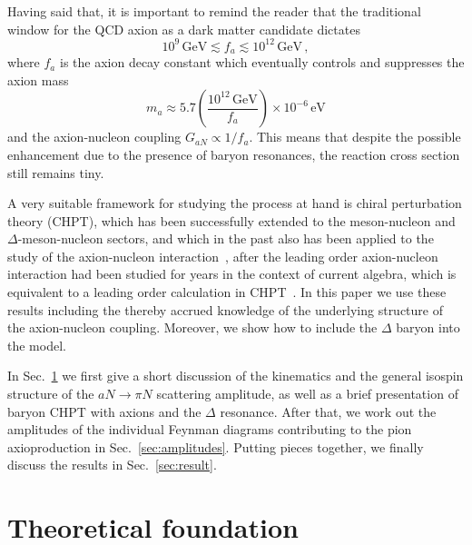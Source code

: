 \documentclass[reprint,amssymb,amsmath,floatfix,aps,prd,groupedaddress,nofootinbib]{revtex4-2}
\begin{document}
Having said that, it is important to remind the reader that the traditional window for the QCD axion as a
dark matter candidate dictates~\cite{Preskill:1982cy,Abbott:1982af,Kim:1986ax,Kim:2008hd}
\begin{equation}\label{eq:window}
10^{9}\,\text{GeV} \lesssim f_a \lesssim 10^{12}\,\text{GeV}\,,
\end{equation}
where $f_a$ is the axion decay constant which eventually controls and suppresses the axion
mass~\cite{Lu:2020rhp,DiLuzio:2020wdo}
\begin{equation}
m_a \approx 5.7 \left(\frac{10^{12}\,\text{GeV}}{f_a} \right) \times 10^{-6}  \,\text{eV}
\end{equation}
and the axion-nucleon coupling $G_{aN} \propto 1/f_a$. This means that despite the possible enhancement due to the presence of baryon resonances, the reaction cross section still remains tiny.

A very suitable framework for studying the process at hand is chiral perturbation theory (CHPT), which
has been successfully extended to the meson-nucleon and $\Delta$-meson-nucleon sectors, and which in the
past also has been applied to the study of the axion-nucleon interaction~\cite{GrillidiCortona:2015jxo,Vonk:2020zfh},
after the leading order axion-nucleon interaction had been studied for years in the context of current
algebra, which is equivalent to a leading order calculation in CHPT~\cite{Donnelly:1978ty,Kaplan:1985dv,Srednicki:1985xd,Georgi:1986df,Chang:1993gm}. In this paper
we use these results including the thereby accrued knowledge of the underlying structure of the
axion-nucleon coupling. Moreover, we show how to include the $\Delta$ baryon into the model. 

In Sec.~\ref{sec:basic} we first give a short discussion of the kinematics and the general isospin
structure of the $aN\to \pi N$ scattering amplitude, as well as a brief presentation of baryon CHPT with axions and the  $\Delta$ resonance. After that, we  work out the amplitudes of the individual
Feynman diagrams contributing to the pion axioproduction in Sec.~\ref{sec:amplitudes}. Putting pieces
together, we finally discuss the results in Sec.~\ref{sec:result}.

\section{Theoretical foundation}\label{sec:basic}
\end{document}
